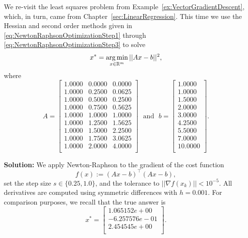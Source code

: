 \vspace*{.2cm}

\begin{example}
\label{ex:VectorHessianLeastSquares}
We re-visit the least squares problem from Example~\ref{ex:VectorGradientDescent}, which, in turn, came from Chapter~\ref{sec:LinearRegression}. This time we use the Hessian and second order methods given in \eqref{eq:NewtonRaphsonOptimizationStep1} through \eqref{eq:NewtonRaphsonOptimizationStep3} to solve $$x^\ast = \operatorname*{arg\,min}_{x \in \mathbb R^m} ||Ax-b ||^2, $$
where
$$
A=\left[
\begin{array}{ccc}
1.0000 & 0.0000 & 0.0000 \\
1.0000 & 0.2500 & 0.0625 \\
1.0000 & 0.5000 & 0.2500 \\
1.0000 & 0.7500 & 0.5625 \\
1.0000 & 1.0000 & 1.0000 \\
1.0000 & 1.2500 & 1.5625 \\
1.0000 & 1.5000 & 2.2500 \\
1.0000 & 1.7500 & 3.0625 \\
1.0000 & 2.0000 & 4.0000 \\
\end{array}
\right]
~~~\text{and}~~~
b=
\left[
\begin{array}{c}
1.0000 \\
1.0000 \\
1.5000 \\
2.0000 \\
3.0000 \\
4.2500 \\
5.5000 \\
7.0000 \\
10.0000 \\
\end{array}
\right].
$$

\end{example}

\textbf{Solution:} We apply Newton-Raphson to the gradient of the cost function
$$f(x):= \left(A x -b \right)^\top \left(  Ax-b \right), $$ set the step size $s \in \{0.25, 1.0 \}$, and the tolerance to $|| \nabla f(x_k) || < 10^{-5}$. All derivatives are computed using symmetric differences with $h=0.001$. For comparison purposes, we recall that the true answer is
\begin{equation}
x^\ast=\left[
\begin{array}{r}
1.065152e+00 \\
-6.257576e-01 \\
2.454545e+00 \\
\end{array}
\right].
\end{equation}\\

